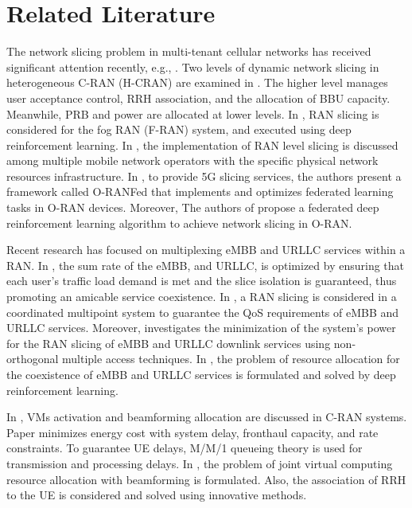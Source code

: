 \documentclass[lettersize,journal]{IEEEtran}
\begin{document}
\section{Related Literature}\label{RL}
\vspace{-1mm}
The network slicing problem in multi-tenant cellular networks has received significant attention recently, e.g.,  \cite{feng2020dynamic,lee2018dynamic,lee2016new}.
Two levels of dynamic network slicing in heterogeneous C-RAN (H-CRAN) are examined in \cite{lee2018dynamic}. The higher level manages user acceptance control, RRH association, and the allocation of BBU capacity. Meanwhile, PRB and power are allocated at lower levels.
In \cite{xiang2020realization}, RAN slicing is considered for the fog RAN (F-RAN) system, and executed using deep reinforcement learning. In \cite{elayoubi20195g,d2020toward}, the implementation of RAN level slicing is discussed among multiple mobile network operators with the specific physical network resources infrastructure.
In \cite{singh2022joint}, to provide 5G slicing services, the authors present a framework called O-RANFed that implements and optimizes federated learning tasks in O-RAN devices.
Moreover, The authors of \cite{zhang2022federated} propose a federated deep reinforcement learning algorithm to achieve network slicing in O-RAN.

Recent research has focused on multiplexing eMBB and URLLC services within a RAN.
In \cite{setayesh2020joint}, the sum rate of the eMBB, and URLLC, is optimized by ensuring that each user's traffic load demand is met and the slice isolation is guaranteed, thus promoting an amicable service coexistence.
In \cite{yang2020should}, a RAN slicing is considered in a coordinated multipoint system to guarantee the QoS requirements of eMBB and URLLC services. Moreover, \cite{saggese2021power} investigates the minimization of the system's power for the  RAN slicing of eMBB and URLLC downlink services using non-orthogonal multiple access techniques.
In \cite{alsenwi2021intelligent}, the problem of resource allocation for the coexistence of eMBB and URLLC services is formulated and solved by deep reinforcement learning.
 
In \cite{SystemCostMinimization,guo2016exploiting}, VMs activation and beamforming allocation are discussed in C-RAN systems.
Paper \cite{SystemCostMinimization} minimizes energy cost with system delay, fronthaul capacity, and rate constraints.
To guarantee UE delays, M/M/1 queueing theory is used for transmission and processing delays.
In \cite{luong2018joint,luong2018novel}, the problem of joint virtual computing resource allocation with beamforming is formulated. Also, the association of RRH to the UE is considered and solved using innovative methods.
\end{document}
